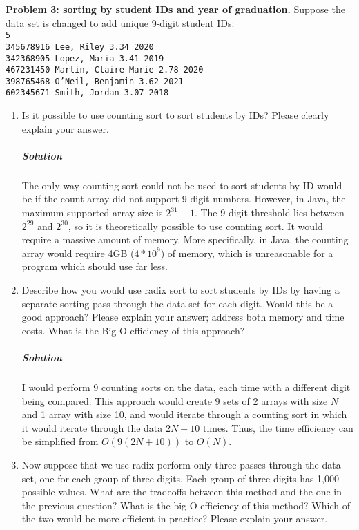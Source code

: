\documentclass[a4paper]{amsart}
\newenvironment*{problem}{}{}
\def\code#1{\texttt{#1}}
\begin{document}
	\begin{problem}
		\textbf{Problem 3: sorting by student IDs and year of graduation.} Suppose the data set is changed to add unique 9-digit student IDs:
		\code{
			\\ 5 \\
			345678916 Lee, Riley 3.34 2020 \\
			342368905 Lopez, Maria 3.41 2019 \\
			467231450 Martin, Claire-Marie 2.78 2020 \\
			398765468 O’Neil, Benjamin 3.62 2021 \\
			602345671 Smith, Jordan 3.07 2018 \\}
		\begin{enumerate}
			\item Is it possible to use counting sort to sort students by IDs? Please clearly explain your answer.
			
			\subparagraph{\textbf{Solution}} The only way counting sort could not be used to sort students by ID would be if the count array did not support 9 digit numbers. However, in Java, the maximum supported array size is $2^{31}-1$. The 9 digit threshold lies between $2^{29}$ and $2^{30}$, so it is theoretically possible to use counting sort. It would require a massive amount of memory. More specifically, in Java, the counting array would require 4GB ($4*10^9$) of memory, which is unreasonable for a program which should use far less.
			
			\item  Describe how you would use radix sort to sort students by IDs by having a separate sorting pass through the data set for each digit. Would this be a good approach? Please explain your answer; address both memory and time costs. What is the Big-O efficiency of this approach?
			
			\subparagraph{\textbf{Solution}} I would perform 9 counting sorts on the data, each time with a different digit being compared. This approach would create 9 sets of 2 arrays with size $N$ and 1 array with size 10, and would iterate through a counting sort in which it would iterate through the data $2N+10$ times. Thus, the time efficiency can be simplified from $O(9(2N+10))$ to $O(N)$.
			
			\item Now suppose that we use radix perform only three passes through the data set, one for each group of three digits. Each group of three digits has 1,000 possible values. What are the tradeoffs between this method
			and the one in the previous question? What is the big-O efficiency of this method? Which of the two would be more efficient in practice? Please explain your answer.
			

\end{enumerate}
\end{problem}
\end{document}
